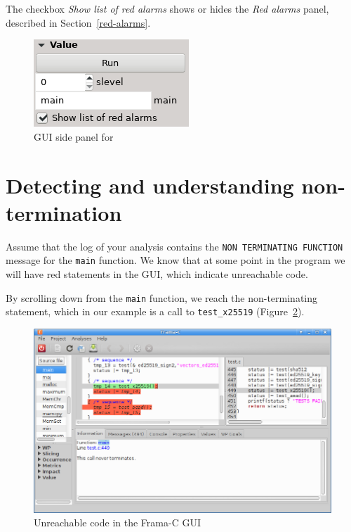 The checkbox {\em Show list of red alarms} shows or hides the
{\em Red alarms} panel, described in Section~\ref{red-alarms}.

\begin{figure}
\centering
\includegraphics[scale=0.7]{gui-images/gui-side-panel.png}
\caption{GUI side panel for \Eva{}}
\label{fig:gui-side-panel}
\end{figure}


\section{Detecting and understanding non-termination}
\label{sec:non-termination-gui}

Assume that the log of your analysis contains the \texttt{NON\
  TERMINATING\ FUNCTION} message for the \texttt{main} function.
We know that
at some point in the program we will have red statements in the GUI,
which indicate unreachable code.

By scrolling down from the \texttt{main} function, we reach the
non-terminating statement, which in our example is a call to
\texttt{test\_x25519} (Figure~\ref{fig:gui-unreachable}).

\begin{figure}[hbt]
\centering
\includegraphics[width=\textwidth]{gui-images/gui2.png}
\caption{Unreachable code in the Frama-C GUI}
\label{fig:gui-unreachable}
\end{figure}

